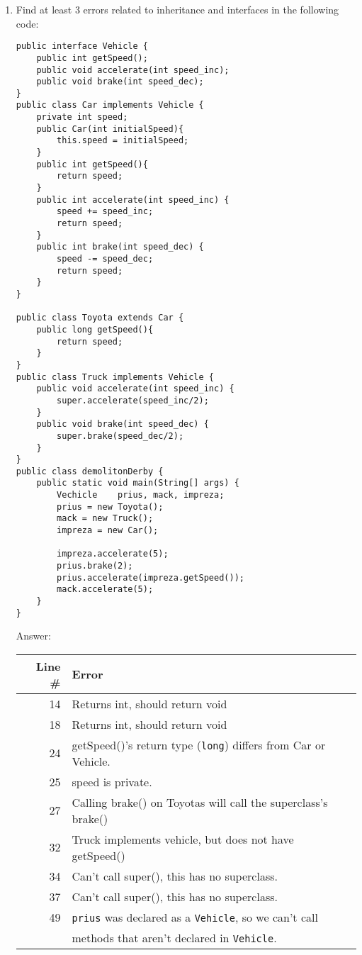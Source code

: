 \documentclass[11pt]{article}
\newenvironment{answer}{\large\lstset{basicstyle=\tiny\ttfamily}\color{white} \small{Answer:}}{}
\newenvironment{answer}{\large\lstset{basicstyle=\large\ttfamily}\color{red} \small{Answer:}}{}
\begin{document}
\begin{enumerate}
\vspace{-24pt}


\newpage
\item Find at least 3 errors related to inheritance and interfaces in the following code:\label{demolition-derby}
\begin{lstlisting}
public interface Vehicle {
	public int getSpeed();
	public void accelerate(int speed_inc);
	public void brake(int speed_dec);
}
public class Car implements Vehicle {
	private int speed;
	public Car(int initialSpeed){
		this.speed = initialSpeed;
	}
	public int getSpeed(){
		return speed;
	}
	public int accelerate(int speed_inc) {
		speed += speed_inc;
		return speed;
	}
	public int brake(int speed_dec) {
		speed -= speed_dec;
		return speed;
	}
}

public class Toyota extends Car {
	public long getSpeed(){
		return speed;
	}
}
public class Truck implements Vehicle {
	public void accelerate(int speed_inc) {
		super.accelerate(speed_inc/2);
	}
	public void brake(int speed_dec) {
		super.brake(speed_dec/2);
	}
}
public class demolitonDerby {
	public static void main(String[] args) {
		Vechicle	prius, mack, impreza;
		prius = new Toyota();
		mack = new Truck();
		impreza = new Car();
		
		impreza.accelerate(5);
		prius.brake(2);
		prius.accelerate(impreza.getSpeed());
		mack.accelerate(5);
	}
}
\end{lstlisting}

\begin{answer}
    \begin{tabular}{r l} %
    Line \# & Error \\\hline
    14  	& Returns int, should return void\\
    18  	& Returns int, should return void\\
    24  	& getSpeed()'s return type ({\tt long}) differs from Car or Vehicle.\\
    25  	& speed is private.\\
    27		& Calling brake() on Toyotas will call the superclass's brake()\\
    32  	& Truck implements vehicle, but does not have getSpeed()\\
    34  	& Can't call super(), this has no superclass.\\
    37  	& Can't call super(), this has no superclass.\\
    49  	& {\tt prius} was declared as a {\tt Vehicle}, so we can't call\\
    ~  		& methods that aren't declared in {\tt Vehicle}.\\
    \end{tabular}
\end{answer}




\end{enumerate}
\end{document}
